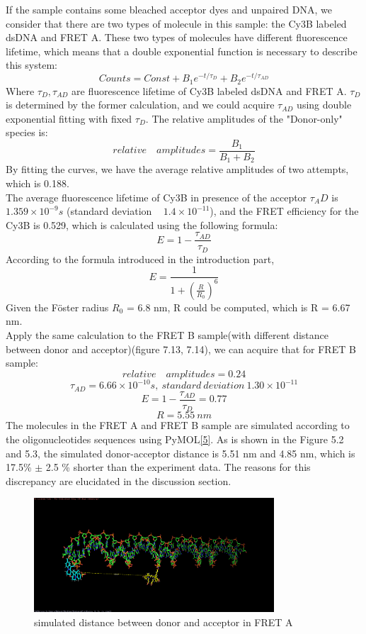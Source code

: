 \documentclass[a4paper,english,12pt,bibliography=totoc]{scrreprt}
\begin{document}
If the sample contains some bleached acceptor dyes and unpaired DNA, we consider that there are two types of molecule in this sample: the Cy3B labeled dsDNA and FRET A. These two types of molecules have different fluorescence lifetime, which means that a double exponential function is necessary to describe this system:
\[
Counts = Const + B_1e^{-t/\tau_D} + B_2e^{-t/\tau_{AD}}
\]
Where $\tau_D, \tau_{AD}$ are fluorescence lifetime of Cy3B labeled dsDNA and FRET A. $\tau_D$ is determined by the former calculation, and we could acquire  $\tau_{AD}$ using double exponential fitting with fixed $\tau_D$. The relative amplitudes of the "Donor-only" species is:
\[
relative \quad amplitudes = \frac{B_1}{B_1 + B_2}
\]
By fitting the curves, we have the average relative amplitudes of two attempts, which is 0.188. \\

The average fluorescence lifetime of Cy3B in presence of the acceptor $\tau_AD$ is $1.359 \times 10^{-9}s$ (standard deviation ~ $1.4 \times 10^{-11}$), and the FRET efficiency for the Cy3B is 0.529, which is calculated using the following formula:
\[
E = 1 - \frac{\tau_{AD}}{\tau_D}
\]
According to the formula introduced in the introduction part,
\[
E = \frac{1}{{1 + (\frac{R}{R_0})^6}}
\]
Given the Föster radius $R_0$ = 6.8 nm, R could be computed, which is R = 6.67 nm.\\

Apply the same calculation to the FRET B sample(with different distance between donor and acceptor)(figure 7.13, 7.14), we can acquire that for FRET B sample:
\[
relative \quad amplitudes = 0.24
\]
\[
\tau_{AD} = 6.66 \times 10^{-10}s, \ standard \ deviation ~ 1.30\times 10^{-11}
\]
\[
E = 1 - \frac{\tau_{AD}}{\tau_D} = 0.77
\]
\[
R = 5.55 \ nm
\]
The molecules in the FRET A and FRET B sample are simulated according to the oligonucleotides sequences using PyMOL\hyperref[sec:ref_5]{[5]}. As is shown in the Figure 5.2 and 5.3, the simulated donor-acceptor distance is 5.51 nm and 4.85 nm, which is 17.5\% $\pm$ 2.5 \% shorter than the experiment data.
The reasons for this discrepancy are elucidated in the discussion section.
\begin{figure}
    \centering
    \includegraphics[width=0.8\textwidth]{images/other/DistanceFretA.png}
    \caption{simulated distance between donor and acceptor in FRET A}
    \label{Cy3_data1_fit1}
\end{figure}
\end{document}
